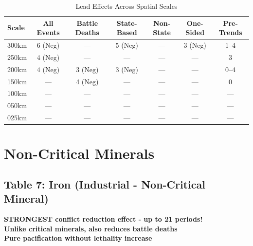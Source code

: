 \documentclass[11pt]{article}
\begin{document}
\begin{table}[H]
\centering
\caption{Lead Effects Across Spatial Scales}
\begin{tabular}{lcccccc}
\toprule
Scale & All Events & Battle Deaths & State-Based & Non-State & One-Sided & Pre-Trends \\
\midrule
300km & 6 (Neg)   & ---           & 5 (Neg)     & ---       & 3 (Neg)   & 1--4       \\
250km & 4 (Neg)   & ---           & ---         & ---       & ---       & 3          \\
200km & 4 (Neg)   & 3 (Neg)       & 3 (Neg)     & ---       & ---       & 0--4       \\
150km & ---       & 4 (Neg)       & ---         & ---       & ---       & 0          \\
100km & ---       & ---           & ---         & ---       & ---       & ---        \\
050km & ---       & ---           & ---         & ---       & ---       & ---        \\
025km & ---       & ---           & ---         & ---       & ---       & ---        \\
\bottomrule
\end{tabular}
\end{table}

\clearpage

\section{Non-Critical Minerals}

\subsection{Table 7: Iron (Industrial - Non-Critical Mineral)}

\textbf{STRONGEST conflict reduction effect - up to 21 periods!}\\
\textbf{Unlike critical minerals, also reduces battle deaths}\\
\textbf{Pure pacification without lethality increase}
\end{document}
